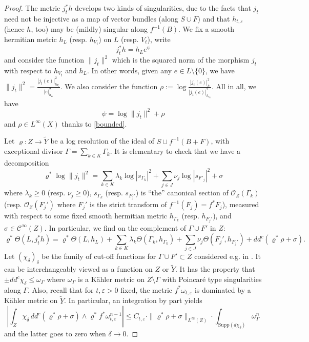 \documentclass[12pt]{amsart}
\theoremstyle{definition}
\newcommand{\tY}{\widetilde{Y}}
\newcommand{\cO}{\mathcal{O}}
\numberwithin{equation}{section}
\newcommand{\ep}{\varepsilon}
\begin{document}
\begin{proof}
The metric $j_t^*h$ develops two kinds of singularities, due to the facts that $j_t$ need not be injective as a map of vector bundles (along $S\cup F$) and that $h_{t,\ep}$ (hence $h$, too) may be (mildly) singular along $f^{-1}(B)$. We fix a smooth hermitian metric $h_L$ (resp. $h_{V_t}$) on $L$ (resp. $V_t$), write 
\[j_t^*h=h_Le^{\psi}\]
and consider the function $\|j_t\|^2$ which is the squared norm of the morphism $j_t$ with respect to $h_{V_t}$ and $h_L$. In other words, given any $e\in L\setminus \{0\}$, we have $\|j_t\|^2=\frac{|j_t(e)|^2_{h_{V_t}}}{|e|^2_{h_L}}$. We also consider the function $\rho:=\log \frac{|j_t(e)|^2_{h }}{|j_t(e)|^2_{h_{V_t}}}$. All in all, we have 
\[\psi=\log \|j_t\|^2+\rho\]
and $\rho \in L^{\infty}(X)$ thanks to \eqref{bounded}.

Let $\varrho: Z\to \tY$ be a log resolution of the ideal of $S\cup f^{-1}(B+F)$, with exceptional divisor $\Gamma=\sum_{k\in K} \Gamma_k$. It is elementary to check that we have a decomposition
\[\varrho^*\log \|j_t\|^2=\sum_{k\in K} \lambda_k \log |s_{\Gamma_k}|^2+\sum_{j\in J} \nu_j\log |s_{F'_j}|^2+ \sigma\]
where $\lambda_k \ge 0$ (resp. $\nu_j \ge 0$), $s_{\Gamma_k}$ (resp. $s_{F_j'}$) is ``the'' canonical section of $\cO_Z(\Gamma_k)$ (resp. $\cO_Z(F_j')$ where $F_j'$ is the strict transform of $f^{-1}(F_j)=f^*F_j$), measured with respect to some fixed smooth hermitian metric $h_{\Gamma_k}$ (resp. $h_{F_j'}$), and $\sigma \in \mathcal C^{\infty}(Z)$. In particular, we find on the complement of $\Gamma\cup F'$ in $Z$:
\begin{equation}
\label{id}
\varrho^*\Theta(L, j_t^*h)=\varrho^*\Theta(L,h_L)+\sum_{k\in K}\lambda_k\Theta(\Gamma_k, h_{\Gamma_k})+\sum_{j\in J}\nu_j\Theta(F_j', h_{F_j'})+dd^c(\varrho^*\rho+\sigma).
\end{equation}
Let $(\chi_\delta)_\delta$ be the family of cut-off functions for $\Gamma \cup F'\subset Z$ considered e.g. in \cite{GP-conic}. It can be interchangeably viewed as a function on $Z$ or $\tY$. It has the property that $\pm dd^c \chi_\delta \le \omega_\Gamma$ where $\omega_\Gamma$ is a K\"ahler metric on $Z\setminus \Gamma$ with Poincar\'e type singularities along $\Gamma$. Also, recall that for $t,\ep>0$ fixed, the metric $f^*\omega_{t,\ep}$ is dominated by a K\"ahler metric on $\tY$. In particular, an integration by part yields 
\begin{equation}
\label{int zero}
\left| \int_{Z} \chi_\delta \, dd^c(\varrho^*\rho+\sigma) \wedge \varrho^*f^*\omega_{t,\ep}^{n-1} \right| \le C_{t,\ep}\cdot \|\varrho^*\rho+\sigma\|_{L^{\infty}(Z)}\cdot  \int_{\mathrm{Supp}(d\chi_\delta)} \omega_\Gamma^n 
\end{equation}
and the latter goes to zero when $\delta \to 0$. 


\end{proof}
\end{document}
